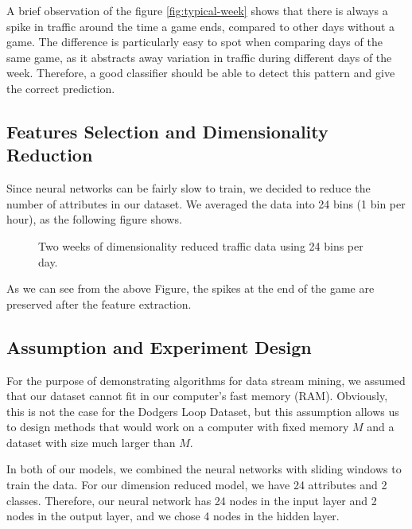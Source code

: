 \documentclass[conference]{IEEEtran}
\begin{document}
		A brief observation of the figure \ref{fig:typical-week} shows that there is always a spike in traffic around the time a game ends, compared to other days without a game. The difference is particularly easy to spot when comparing days of the same game, as it abstracts away variation in traffic during different days of the week. Therefore, a good classifier should be able to detect this pattern and give the correct prediction.
		
		\subsection{Features Selection and Dimensionality Reduction}
		Since neural networks can be fairly slow to train, we decided to reduce the number of attributes in our dataset. We averaged the data into 24 bins (1 bin per hour), as the following figure shows.
		
		\begin{figure}[H]
			\caption{Two weeks of dimensionality reduced traffic data using 24 bins per day.}
			\label{fig:two-weeks-reduced-dimensionality}
		\end{figure}
		As we can see from the above Figure, the spikes at the end of the game are preserved after the feature extraction.
		
		\subsection{Assumption and Experiment Design}
		For the purpose of demonstrating algorithms for data stream mining, we assumed that our dataset cannot fit in our computer's fast memory (RAM). Obviously, this is not the case for the Dodgers Loop Dataset, but this assumption allows us to design methods that would work on a computer with fixed memory $M$ and a dataset with size much larger than $M$.
		
		In both of our models, we combined the neural networks with sliding windows to train the data. For our dimension reduced model, we have 24 attributes and 2 classes. Therefore, our neural network has 24 nodes in the input layer and 2 nodes in the output layer, and we chose 4 nodes in the hidden layer. 
		
\end{document}
